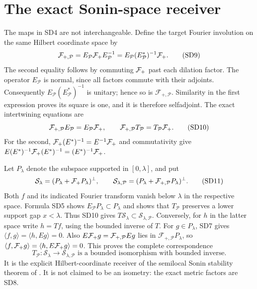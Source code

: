 \section{The exact Sonin-space receiver}
The maps in SD4 are not interchangeable. Define the target Fourier
involution on the same Hilbert coordinate space by
\[
 \mathcal F_{+,\mathcal P}=E_{\mathcal P}\mathcal F_+ E_{\mathcal P}^{-1}
   =E_{\mathcal P}(E_{\mathcal P}^*)^{-1}\mathcal F_+.                    \tag{SD9}
\]
The second equality follows by commuting $\mathcal F_+$ past each dilation
factor. The operator $E_{\mathcal P}$ is normal, since all factors
commute with their adjoints. Consequently
$E_{\mathcal P}(E_{\mathcal P}^*)^{-1}$ is unitary; hence so is
$\mathcal F_{+,\mathcal P}$. Similarity in the first expression proves its
square is one, and it is therefore selfadjoint. The exact
intertwining equations are
\[
 \mathcal F_{+,\mathcal P}E_{\mathcal P}=E_{\mathcal P}\mathcal F_+,
 \qquad\mathcal F_{+,\mathcal P}T_{\mathcal P}=T_{\mathcal P}\mathcal F_+.
                                                               \tag{SD10}
\]
For the second, $\mathcal F_+(E^*)^{-1}=E^{-1}\mathcal F_+$ and commutativity give
$E(E^*)^{-1}\mathcal F_+(E^*)^{-1}=(E^*)^{-1}\mathcal F_+$.

Let $P_\lambda$ denote the subspace supported in $[0,\lambda]$,
and put
\[
 \mathcal S_\lambda=(P_\lambda+\mathcal F_+ P_\lambda)^\perp,
 \qquad
 \mathcal S_{\lambda,\mathcal P}
      =(P_\lambda+\mathcal F_{+,\mathcal P}P_\lambda)^\perp.              \tag{SD11}
\]
Both $f$ and its indicated Fourier transform vanish below $\lambda$
in the respective space. Formula SD5 shows
$E_{\mathcal P}P_\lambda\subset P_\lambda$ and shows that
$T_{\mathcal P}$ preserves a lower support gap $x<\lambda$.
Thus SD10 gives $T\mathcal S_\lambda\subset
\mathcal S_{\lambda,\mathcal P}$.
Conversely, for $h$ in the latter space write $h=Tf$, using the
bounded inverse of $T$. For $g\in P_\lambda$, SD7 gives
$\langle f,g\rangle=\langle h,Eg\rangle=0$.
Also $E\mathcal F_+ g=\mathcal F_{+,\mathcal P}Eg$ lies in
$\mathcal F_{+,\mathcal P}P_\lambda$, so
$\langle f,\mathcal F_+ g\rangle=\langle h,E\mathcal F_+ g\rangle=0$.
This proves the complete correspondence
\[
 \boxed{T_{\mathcal P}:\mathcal S_\lambda
       \longrightarrow\mathcal S_{\lambda,\mathcal P}
       \text{ is a bounded isomorphism with bounded inverse}.}  \tag{SD12}
\]
It is the explicit Hilbert-coordinate receiver of the semilocal
Sonin stability theorem of \cite{swdual:CCM}. It is not claimed to be an
isometry: the exact metric factors are SD8.

